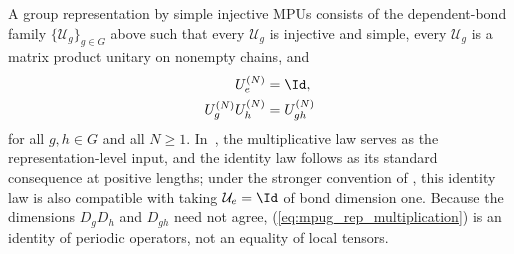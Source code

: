 \begin{definition}
    \label{def:mpug_group_representation}
    \leanok
    A group representation by simple injective MPUs consists of the
    dependent-bond family $\{\mathcal U_g\}_{g\in G}$ above such that every
    $\mathcal U_g$ is injective and simple, every $\mathcal U_g$ is a matrix
    product unitary on nonempty chains, and
    \begin{align}
        U_e^{(N)}          & =\Id,
        \label{eq:mpug_rep_identity}       \\
        U_g^{(N)}U_h^{(N)} & =U_{gh}^{(N)}
        \label{eq:mpug_rep_multiplication}
    \end{align}
    for all $g,h\in G$ and all $N\geq1$.
    In~\cite[Subsection ``MPU group representations'']
    {FrancoRubio2025MPUGauging}, the multiplicative law serves as the
    representation-level input, and the identity law follows as its standard
    consequence at positive lengths; under the stronger convention of
    \cite[Subsection ``Assumptions for the rest of the paper'']
    {FrancoRubio2025MPUGauging}, this identity law is also compatible with
    taking $\mathcal U_e=\Id$ of bond dimension one.
    Because the dimensions $D_gD_h$ and $D_{gh}$ need not agree,
    (\ref{eq:mpug_rep_multiplication}) is an identity of periodic operators,
    not an equality of local tensors.
\end{definition}

